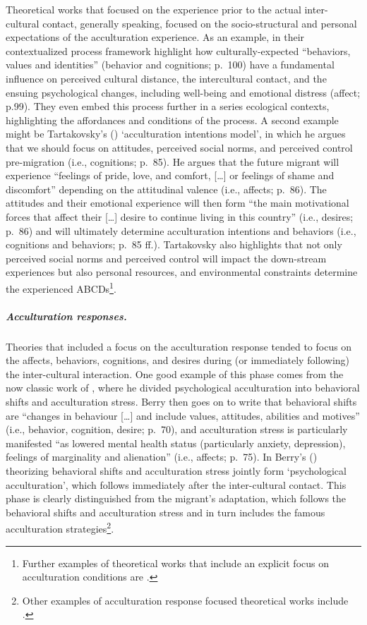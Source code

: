 Theoretical works that focused on the experience prior to the actual
inter-cultural contact, generally speaking, focused on the
socio-structural and personal expectations of the acculturation
experience. As an example, \citet[][]{Ward2016} in their contextualized
process framework highlight how culturally-expected ``behaviors, values
and identities'' (behavior and cognitions; p.~100) have a fundamental
influence on perceived cultural distance, the intercultural contact, and
the ensuing psychological changes, including well-being and emotional
distress (affect; p.99). They even embed this process further in a
series ecological contexts, highlighting the affordances and conditions
of the process. A second example might be Tartakovsky's
(\citeyear[][]{Tartakovsky2012}) `acculturation intentions model', in
which he argues that we should focus on attitudes, perceived social
norms, and perceived control pre-migration (i.e., cognitions; p.~85). He
argues that the future migrant will experience ``feelings of pride,
love, and comfort, {[}\ldots{]} or feelings of shame and discomfort''
depending on the attitudinal valence (i.e., affects; p.~86). The
attitudes and their emotional experience will then form ``the main
motivational forces that affect their {[}\ldots{]} desire to continue
living in this country'' (i.e., desires; p.~86) and will ultimately
determine acculturation intentions and behaviors (i.e., cognitions and
behaviors; p.~85 ff.). Tartakovsky also highlights that not only
perceived social norms and perceived control will impact the down-stream
experiences but also personal resources, and environmental constraints
determine the experienced
ABCDs\footnote{Further examples of theoretical works that include an explicit focus on acculturation conditions are \citet[][]{Kim1988, Rogler1994, Navas2005, Giles1977, Robinson2019, Serdarevic2005}.}.

\subparagraph{Acculturation responses.}

Theories that included a focus on the acculturation response tended to
focus on the affects, behaviors, cognitions, and desires during (or
immediately following) the inter-cultural interaction. One good example
of this phase comes from the now classic work of \citet[][]{Berry1992},
where he divided psychological acculturation into behavioral shifts and
acculturation stress. Berry then goes on to write that behavioral shifts
are ``changes in behaviour {[}\ldots{]} and include values, attitudes,
abilities and motives'' (i.e., behavior, cognition, desire; p.~70), and
acculturation stress is particularly manifested ``as lowered mental
health status (particularly anxiety, depression), feelings of
marginality and alienation'' (i.e., affects; p.~75). In Berry's
(\citeyear{Berry1992}) theorizing behavioral shifts and acculturation
stress jointly form `psychological acculturation', which follows
immediately after the inter-cultural contact. This phase is clearly
distinguished from the migrant's adaptation, which follows the
behavioral shifts and acculturation stress and in turn includes the
famous acculturation
strategies\footnote{Other examples of acculturation response focused theoretical works include \citet[][]{Berry2005, Sam2003, Riedel2011, Ward2016}.}.

